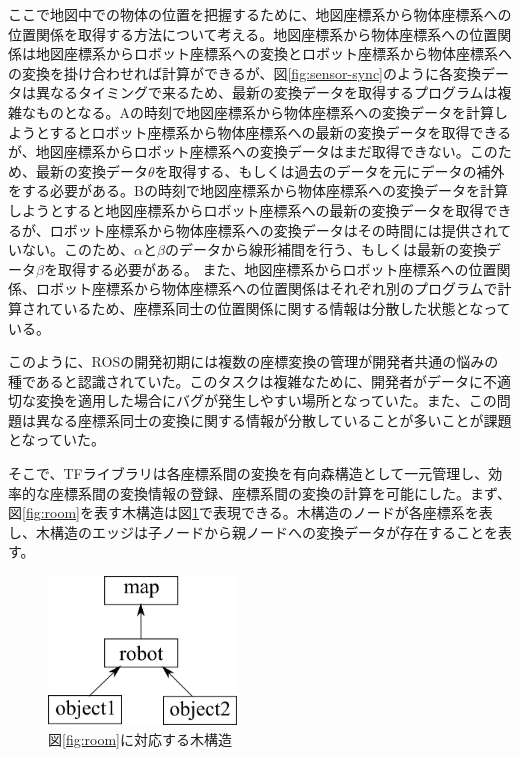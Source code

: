 \documentclass[a4paper]{jreport}	%
\begin{document}
ここで地図中での物体の位置を把握するために、地図座標系から物体座標系への位置関係を取得する方法について考える。地図座標系から物体座標系への位置関係は地図座標系からロボット座標系への変換とロボット座標系から物体座標系への変換を掛け合わせれば計算ができるが、図\ref{fig:sensor-sync}のように各変換データは異なるタイミングで来るため、最新の変換データを取得するプログラムは複雑なものとなる。Aの時刻で地図座標系から物体座標系への変換データを計算しようとするとロボット座標系から物体座標系への最新の変換データを取得できるが、地図座標系からロボット座標系への変換データはまだ取得できない。このため、最新の変換データ$\theta$を取得する、もしくは過去のデータを元にデータの補外をする必要がある。Bの時刻で地図座標系から物体座標系への変換データを計算しようとすると地図座標系からロボット座標系への最新の変換データを取得できるが、ロボット座標系から物体座標系への変換データはその時間には提供されていない。このため、$\alpha$と$\beta$のデータから線形補間を行う、もしくは最新の変換データ$\beta$を取得する必要がある。
また、地図座標系からロボット座標系への位置関係、ロボット座標系から物体座標系への位置関係はそれぞれ別のプログラムで計算されているため、座標系同士の位置関係に関する情報は分散した状態となっている。


このように、ROSの開発初期には複数の座標変換の管理が開発者共通の悩みの種であると認識されていた。このタスクは複雑なために、開発者がデータに不適切な変換を適用した場合にバグが発生しやすい場所となっていた。また、この問題は異なる座標系同士の変換に関する情報が分散していることが多いことが課題となっていた。

そこで、TFライブラリは各座標系間の変換を有向森構造として一元管理し、効率的な座標系間の変換情報の登録、座標系間の変換の計算を可能にした。まず、図\ref{fig:room}を表す木構造は図\ref{fig:room-tree}で表現できる。木構造のノードが各座標系を表し、木構造のエッジは子ノードから親ノードへの変換データが存在することを表す。

\begin{figure}[h] 
\centering
\includegraphics[width=5cm]{tree}	
\caption{図\ref{fig:room}に対応する木構造}
\label{fig:room-tree}
\end{figure}
\end{document}

